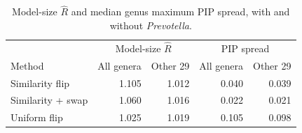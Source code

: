 \begin{table}[t]
\centering
\small
\fontsize{12}{9}\selectfont
\caption{Model-size $\widehat R$ and median genus maximum PIP spread, with and without \textit{Prevotella}.}
\label{tab:real_data_comparison}
\begin{tabular}{lrrrr}
\toprule
 & \multicolumn{2}{c}{Model-size $\widehat R$} & \multicolumn{2}{c}{PIP spread} \\
Method & All genera & Other 29 & All genera & Other 29 \\
\midrule
Similarity flip & 1.105 & 1.012 & 0.040 & 0.039 \\
Similarity + swap & 1.060 & 1.016 & 0.022 & 0.021 \\
Uniform flip & 1.025 & 1.019 & 0.105 & 0.098 \\
\bottomrule
\end{tabular}
\end{table}
